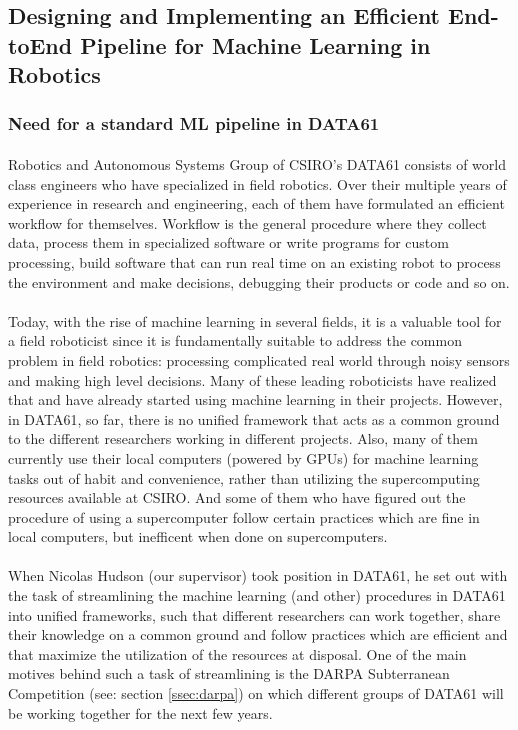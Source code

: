 
\newpage
\subsection{Designing and Implementing an Efficient End-toEnd Pipeline for Machine Learning in Robotics}

\subsubsection{Need for a standard ML pipeline in DATA61}

\paragraph{}
Robotics and Autonomous Systems Group of CSIRO's DATA61 consists of world class engineers who have specialized in field robotics. Over their multiple years of experience in research and engineering, each of them have formulated an efficient workflow for themselves. Workflow is the general procedure where they collect data, process them in specialized software or write programs for custom processing, build software that can run real time on an existing robot to process the environment and make decisions, debugging their products or code and so on. 

\paragraph{}
Today, with the rise of machine learning in several fields, it is a valuable tool for a field roboticist since it is fundamentally suitable to address the common problem in field robotics: processing complicated real world through noisy sensors and making high level decisions. Many of these leading roboticists have realized that and have already started using machine learning in their projects. However, in DATA61, so far, there is no unified framework that acts as a common ground to the different researchers working in different projects. Also, many of them currently use their local computers (powered by GPUs) for machine learning tasks out of habit and convenience, rather than utilizing the supercomputing resources available at CSIRO. And some of them who have figured out the procedure of using a supercomputer follow certain practices which are fine in local computers, but inefficent when done on supercomputers.

\paragraph{}
When Nicolas Hudson (our supervisor) took position in DATA61, he set out with the task of streamlining the machine learning (and other) procedures in DATA61 into unified frameworks, such that different researchers can work together, share their knowledge on a common ground and follow practices which are efficient and that maximize the utilization of the resources at disposal. One of the main motives behind such a task of streamlining is the DARPA Subterranean Competition (see: section \ref{ssec:darpa}) on which different groups of DATA61 will be working together for the next few years. 

